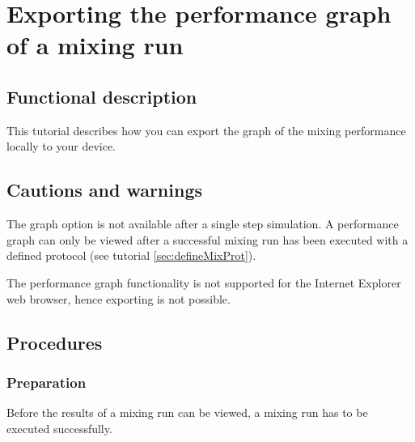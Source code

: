
\section{Exporting the performance graph of a mixing run}
\label{sec:exportSingleGraph}

\subsection{Functional description}
This tutorial describes how you can export the graph of the mixing performance locally to your device.

\subsection{Cautions and warnings}
The graph option is not available after a single step simulation. A performance graph can only be viewed after a successful mixing run has been executed with a defined protocol (see tutorial \ref{sec:defineMixProt}).

The performance graph functionality is not supported for the Internet Explorer web browser, hence exporting is not possible.

\subsection{Procedures}
\subsubsection{Preparation}
Before the results of a mixing run can be viewed, a mixing run has to be executed successfully.


